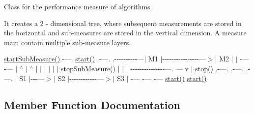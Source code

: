 Class for the performance measure of algorithms.

It creates a 2 -\/ dimensional tree, where subsequent measurements are stored in the horizontal and sub-\/measures are stored in the vertical dimension. A measure main contain multiple sub-\/measure layers.

\hyperlink{classuanc_1_1util_1_1_performance_measure_a7284b6620e998084b6cd548cb0b5c6c3}{start\+Sub\+Measure()}.-\/---. \hyperlink{classuanc_1_1util_1_1_performance_measure_a63d1c53616c602fa930f2b17b50d7604}{start()} .-\/---. .-\/-\/-\/-\/-\/-\/-\/-\/-\/-\/---$\vert$ M1 $\vert$-\/-\/-\/-\/-\/-\/-\/-\/-\/-\/-\/-\/-\/-\/-\/-\/---$>$$\vert$ M2 $\vert$ $\vert$ \textquotesingle{}-\/---\textquotesingle{} \textquotesingle{}-\/---\textquotesingle{} $\vert$ $^\wedge$ $\vert$ $^\wedge$ $\vert$ $\vert$ $\vert$ $\vert$ $\vert$ $\vert$ \hyperlink{classuanc_1_1util_1_1_performance_measure_a82db8e78171d1dfbe4af7fda3fe67a54}{stop\+Sub\+Measure()} $\vert$ $\vert$ $\vert$ \textquotesingle{}-\/-\/-\/-\/-\/-\/-\/-\/-\/-\/-\/-\/-\/-\/-\/---. \textquotesingle{}---\textquotesingle{} v $\vert$ \hyperlink{classuanc_1_1util_1_1_performance_measure_a6931b89f739c6f334b59e85a2b3ce5b8}{stop()} .-\/---. .-\/---. .-\/---. $\vert$ S1 $\vert$-\/-\/-\/---$>$$\vert$ S2 $\vert$-\/-\/-\/-\/-\/-\/-\/-\/-\/-\/-\/-\/---$>$$\vert$ S3 $\vert$ \textquotesingle{}-\/---\textquotesingle{} \textquotesingle{}-\/---\textquotesingle{} \textquotesingle{}-\/---\textquotesingle{} \hyperlink{classuanc_1_1util_1_1_performance_measure_a63d1c53616c602fa930f2b17b50d7604}{start()} \hyperlink{classuanc_1_1util_1_1_performance_measure_a63d1c53616c602fa930f2b17b50d7604}{start()} 

\subsection{Member Function Documentation}
